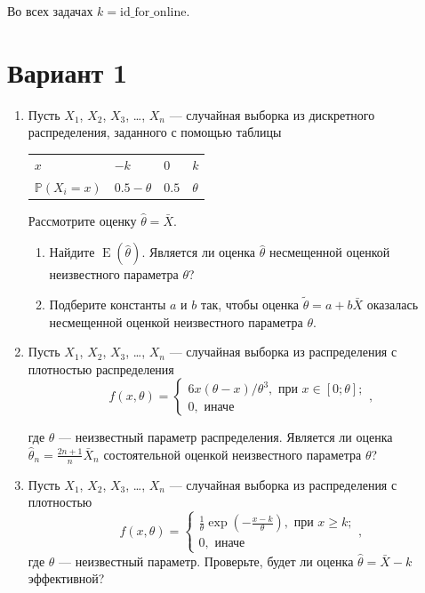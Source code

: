 \documentclass[12pt]{article}
\DeclareMathOperator{\E}{E}
\def \P{\mathbb{P}}
\newcommand \id {\mathrm{id}\_\mathrm{for}\_\mathrm{online}}
\begin{document}
Во всех задачах $k=\id$.

\section*{Вариант 1}
\begin{enumerate}

\item  Пусть $X_1$, $X_2$, $X_3$, \ldots, $X_n$ — случайная выборка из дискретного распределения, 
заданного с помощью таблицы

\begin{tabular}{@{}llll@{}}
  \toprule
   $x$           & $-k$ & $0$ & $k$ \\ 
   $\P(X_i = x)$ & $0.5-\theta$ & $0.5$ & $\theta$ \\
  \bottomrule
\end{tabular}
			
Рассмотрите оценку $\hat \theta = \bar X$.
\begin{enumerate}
\item Найдите $\E(\hat \theta)$. 
Является ли оценка $\hat \theta$ несмещенной оценкой неизвестного параметра $\theta$?
\item Подберите константы $a$ и $b$ так, 
чтобы оценка $\tilde \theta = a + b\bar X$ оказалась несмещенной оценкой неизвестного параметра $\theta$.
\end{enumerate} 


\item Пусть $X_1$, $X_2$, $X_3$, \ldots, $X_n$ — 
случайная выборка из распределения с плотностью распределения
\[
f(x, \theta) = \begin{cases}
  6x(\theta - x)/\theta^3, \text{ при } x\in [0;\theta]; \\
  0, \text{ иначе}
\end{cases},
\]

где $\theta$ — неизвестный параметр распределения. 
Является ли оценка $\hat\theta_n = \frac{2n+1}{n}\bar X_n$ состоятельной оценкой неизвестного параметра $\theta$?

\item Пусть $X_1$, $X_2$, $X_3$, \ldots, $X_n$ — случайная выборка из распределения с плотностью
\[
  f(x, \theta) = \begin{cases}
    \frac{1}{\theta}\exp\left(-\frac{x-k}{\theta}\right), \text{ при } x\geq k; \\
    0, \text{ иначе}
  \end{cases},    
\]
где $\theta$ — неизвестный параметр. Проверьте, будет ли оценка $\hat\theta = \bar X - k$ эффективной?


\end{enumerate}
\end{document}

